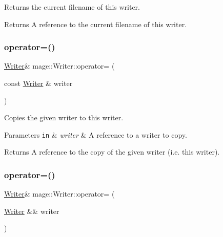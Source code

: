 Returns the current filename of this writer.

\begin{DoxyReturn}{Returns}
A reference to the current filename of this writer. 
\end{DoxyReturn}
\hypertarget{classmage_1_1_writer_a81ea888d1b170515713432ca28629ceb}{}\label{classmage_1_1_writer_a81ea888d1b170515713432ca28629ceb} 
\subsubsection{\texorpdfstring{operator=()}{operator=()}\hspace{0.1cm}{\footnotesize\ttfamily [1/2]}}
{\footnotesize\ttfamily \hyperlink{classmage_1_1_writer}{Writer}\& mage\+::\+Writer\+::operator= (\begin{DoxyParamCaption}\item[{const \hyperlink{classmage_1_1_writer}{Writer} \&}]{writer }\end{DoxyParamCaption})\hspace{0.3cm}{\ttfamily [delete]}}

Copies the given writer to this writer.


\begin{DoxyParams}[1]{Parameters}
\mbox{\tt in}  & {\em writer} & A reference to a writer to copy. \\
\hline
\end{DoxyParams}
\begin{DoxyReturn}{Returns}
A reference to the copy of the given writer (i.\+e. this writer). 
\end{DoxyReturn}
\hypertarget{classmage_1_1_writer_aefbdd9a659983b543358cc8277ab890c}{}\label{classmage_1_1_writer_aefbdd9a659983b543358cc8277ab890c} 
\subsubsection{\texorpdfstring{operator=()}{operator=()}\hspace{0.1cm}{\footnotesize\ttfamily [2/2]}}
{\footnotesize\ttfamily \hyperlink{classmage_1_1_writer}{Writer}\& mage\+::\+Writer\+::operator= (\begin{DoxyParamCaption}\item[{\hyperlink{classmage_1_1_writer}{Writer} \&\&}]{writer }\end{DoxyParamCaption})\hspace{0.3cm}{\ttfamily [delete]}}

